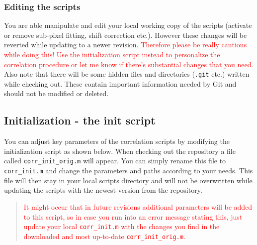 \documentclass[10pt,a4paper,onepage,DIV12]{scrartcl}
\begin{document}
\subsubsection*{Editing the scripts}
You are able manipulate and edit your local working copy of the scripts (activate or remove sub-pixel fitting, shift correction etc.). However these changes will be reverted while updating to a newer revision. \textcolor{red}{Therefore please be really cautious while doing this! Use the initialization script instead to personalize the correlation procedure or let me know if there's substantial changes that you need.}\\

Also note that there will be some hidden files and directories (\texttt{.git} etc.) written while checking out. These contain important information needed by Git and should not be modified or deleted.


\newpage
\subsection{Initialization - the init script}
\label{sec:init}
You can adjust key parameters of the correlation scripts by modifying the initialization script as shown below. When checking out the repository a file called \texttt{corr\_init\_orig.m} will appear. You can simply rename this file to \texttt{corr\_init.m} and change the parameters and paths according to your needs. This file will then stay in your local scripts directory and will not be overwritten while updating the scripts with the newest version from the repository.\\

\begin{quote}\textcolor{red}{
   It might occur that in future revisions additional parameters will be added to this script, so in case you run into an error message stating this, just update your local \texttt{corr\_init.m} with the changes you find in the downloaded and most up-to-date \texttt{corr\_init\_orig.m}.}
 \end{quote}
\end{document}
